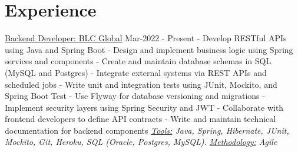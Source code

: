 \documentclass[letterpaper]{twentysecondcv} %
\begin{document}
	


\makeprofile %


\section{Experience}
\newline\newline 
{\large\underline{Backend Developer: BLC Global}}  \hspace*{105pt}  Mar-2022 - Present
\newline\newline
    \newline- Develop RESTful APIs using Java and Spring Boot
    \newline- Design and implement business logic using Spring services and components
    \newline- Create and maintain database schemas in SQL (MySQL and Postgres)
    \newline- Integrate external systems via REST APIs and scheduled jobs
    \newline- Write unit and integration tests using JUnit, Mockito, and Spring Boot Test
    \newline- Use Flyway for database versioning and migrations
    \newline- Implement security layers using Spring Security and JWT
    \newline- Collaborate with frontend developers to define API contracts
    \newline- Write and maintain technical documentation for backend components
    \newline\newline\textit{\underline{Tools:} Java, Spring, Hibernate, JUnit, Mockito, Git, Heroku, SQL (Oracle, Postgres, MySQL). \underline{Methodology:} Agile}
    \newline\newline
\end{document}
